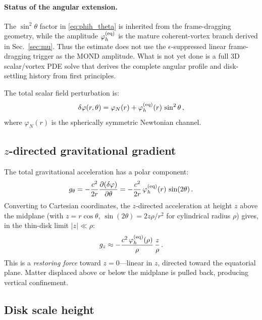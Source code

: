 \documentclass[11pt]{article}
\begin{document}
\paragraph{Status of the angular extension.}
The $\sin^2\theta$ factor in \eqref{eq:phih_theta} is inherited from
the frame-dragging geometry, while the amplitude
$\varphi_h^{(\rm eq)}$ is the mature coherent-vortex branch derived in
Sec.~\ref{sec:mu}.  Thus the estimate does not use the
$\epsilon$-suppressed linear frame-dragging trigger as the MOND
amplitude.  What is not yet done is a full 3D scalar/vortex PDE solve
that derives the complete angular profile and disk-settling history
from first principles.

\noindent The total scalar field perturbation is:
\begin{equation}
\delta\varphi(r,\theta) = \varphi_N(r) + \varphi_h^{(\rm eq)}(r)\,\sin^2\theta\,,
\label{eq:phi_total_theta}
\end{equation}
where $\varphi_N(r)$ is the spherically symmetric Newtonian channel.

\subsection[z-directed gravitational gradient]{$z$-directed gravitational gradient}

The total gravitational acceleration has a polar component:
\begin{equation}
g_\theta = -\frac{c^2}{2r}\frac{\partial(\delta\varphi)}{\partial\theta}
= -\frac{c^2}{2r}\,\varphi_h^{(\rm eq)}(r)\,\sin(2\theta)\,.
\label{eq:g_theta}
\end{equation}
Converting to Cartesian coordinates, the $z$-directed acceleration at height $z$ above the midplane (with $z=r\cos\theta$, $\sin(2\theta)=2z\rho/r^2$ for cylindrical radius $\rho$) gives, in the thin-disk limit $|z|\ll\rho$:
\begin{equation}
g_z \approx -\frac{c^2\,\varphi_h^{(\rm eq)}(\rho)}{\rho}\,\frac{z}{\rho}\,.
\label{eq:gz}
\end{equation}
This is a \emph{restoring force} toward $z=0$---linear in $z$, directed toward the equatorial plane. Matter displaced above or below the midplane is pulled back, producing vertical confinement.

\subsection{Disk scale height}
\end{document}
